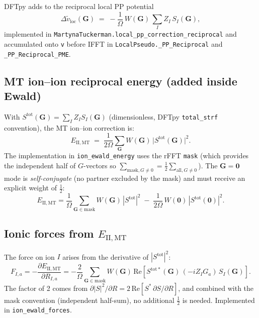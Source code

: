 \documentclass[11pt,a4paper]{article}
\begin{document}
DFTpy adds to the reciprocal local PP potential
\begin{equation}
  \Delta \tilde v_{\mathrm{loc}}(\mathbf G)
  \;=\;
  -\frac{1}{\Omega}\,W(\mathbf G)\,
  \sum_I Z_I\,S_I(\mathbf G),
\end{equation}
implemented in \texttt{MartynaTuckerman.local\_pp\_correction\_reciprocal} and
accumulated onto \texttt{v} before IFFT in \texttt{LocalPseudo.\_PP\_Reciprocal} and
\texttt{\_PP\_Reciprocal\_PME}.

\subsection{MT ion--ion reciprocal energy (added inside Ewald)}

With $S^{\mathrm{tot}}(\mathbf G)=\sum_I Z_I S_I(\mathbf G)$ (dimensionless, DFTpy
\texttt{total\_strf} convention), the MT ion--ion correction is:
\begin{equation}
  E_{\mathrm{II,MT}}
  \;=\;
  \frac{1}{2\Omega}\sum_{\mathbf G}
  W(\mathbf G)\,\bigl|S^{\mathrm{tot}}(\mathbf G)\bigr|^2.
\end{equation}
The implementation in \texttt{ion\_ewald\_energy} uses the rFFT \texttt{mask} (which
provides the independent half of $G$-vectors so
$\sum_{\mathrm{mask},G\ne 0}=\frac{1}{2}\sum_{\mathrm{all},G\ne 0}$).
The $\mathbf G=\mathbf 0$ mode is \emph{self-conjugate} (no partner excluded by the mask)
and must receive an explicit weight of $\frac{1}{2}$:
\begin{equation}
  E_{\mathrm{II,MT}} = \frac{1}{\Omega}\sum_{\mathbf G\in\mathrm{mask}}
  W(\mathbf G)\,|S^{\mathrm{tot}}|^2
  \;-\;
  \frac{1}{2\Omega}\,W(\mathbf 0)\,|S^{\mathrm{tot}}(\mathbf 0)|^2.
\end{equation}

\subsection{Ionic forces from $E_{\mathrm{II,MT}}$}

The force on ion $I$ arises from the derivative of $|S^{\mathrm{tot}}|^2$:
\begin{equation}
  F_{I,a} = -\frac{\partial E_{\mathrm{II,MT}}}{\partial R_{I,a}}
  = -\frac{2}{\Omega}\sum_{\mathbf G\in\mathrm{mask}} W(\mathbf G)\,
    \mathrm{Re}\!\left[S^{\mathrm{tot}*}(\mathbf G)\,(-iZ_I G_a)\,S_I(\mathbf G)\right].
\end{equation}
The factor of 2 comes from $\partial|S|^2/\partial R = 2\,\mathrm{Re}[S^*\,\partial S/\partial R]$,
and combined with the mask convention (independent half-sum), no additional $\frac{1}{2}$ is needed.
Implemented in \texttt{ion\_ewald\_forces}.
\end{document}
